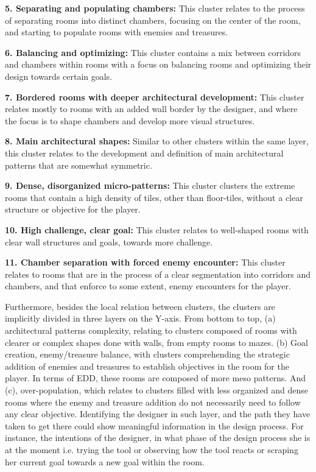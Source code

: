 \textbf{5. Separating and populating chambers:} This cluster relates to the process of separating rooms into distinct chambers, focusing on the center of the room, and starting to populate rooms with enemies and treasures. %

\textbf{6. Balancing and optimizing:} This cluster contains a mix between corridors and chambers within rooms with a focus on balancing rooms and optimizing their design towards certain goals. %

\textbf{7. Bordered rooms with deeper architectural development:} This cluster relates mostly to rooms with an added wall border by the designer, and where the focus is to shape chambers and develop more visual structures.

\textbf{8. Main architectural shapes:} Similar to other clusters within the same layer, this cluster relates to the development and definition of main architectural patterns that are somewhat symmetric.

\textbf{9. Dense, disorganized micro-patterns:} This cluster clusters the extreme rooms that contain a high density of tiles, other than floor-tiles, without a clear structure or objective for the player.

\textbf{10. High challenge, clear goal:} This cluster relates to well-shaped rooms with clear wall structures and goals, towards more challenge. 

\textbf{11. Chamber separation with forced enemy encounter:} This cluster relates to rooms that are in the process of a clear segmentation into corridors and chambers, and that enforce to some extent, enemy encounters for the player. 

Furthermore, besides the local relation between clusters, the clusters are implicitly divided in three layers on the Y-axis. From bottom to top, (a) architectural patterns complexity, relating to clusters composed of rooms with clearer or complex shapes done with walls, from empty rooms to mazes. (b) Goal creation, enemy/treasure balance, with clusters comprehending the strategic addition of enemies and treasures to establish objectives in the room for the player. In terms of EDD, these rooms are composed of more meso patterns. And (c), over-population, which relates to clusters filled with less organized and dense rooms where the enemy and treasure addition do not necessarily need to follow any clear objective. Identifying the designer in such layer, and the path they have taken to get there could show meaningful information in the design process. For instance, the intentions of the designer, in what phase of the design process she is at the moment i.e. trying the tool or observing how the tool reacts or scraping her current goal towards a new goal within the room. 

